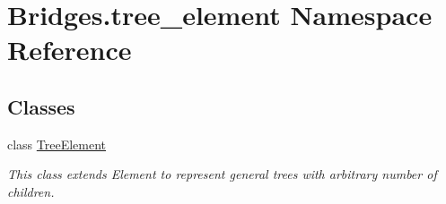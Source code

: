 \hypertarget{namespace_bridges_1_1tree__element}{}\section{Bridges.\+tree\+\_\+element Namespace Reference}
\label{namespace_bridges_1_1tree__element}
\subsection*{Classes}
\begin{DoxyCompactItemize}
\item 
class \mbox{\hyperlink{class_bridges_1_1tree__element_1_1_tree_element}{Tree\+Element}}
\begin{DoxyCompactList}\small\item\em This class extends Element to represent general trees with arbitrary number of children. \end{DoxyCompactList}\end{DoxyCompactItemize}
